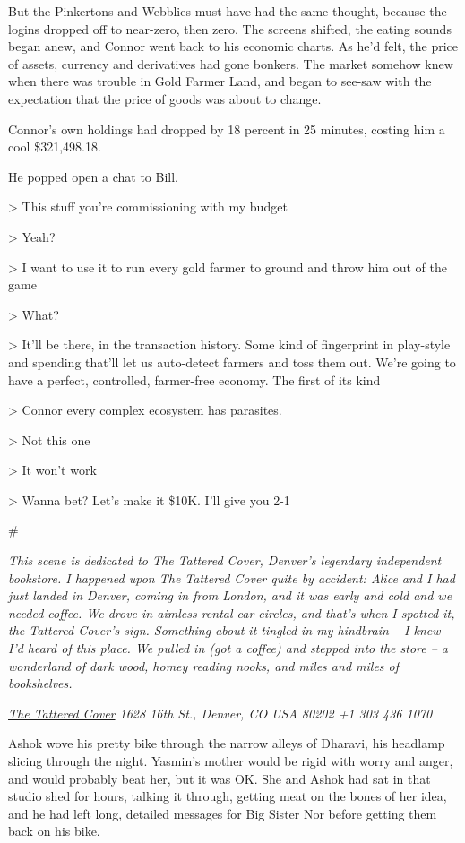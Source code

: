But the Pinkertons and Webblies must have had the same thought,
because the logins dropped off to near-zero, then zero. The screens
shifted, the eating sounds began anew, and Connor went back to his
economic charts. As he'd felt, the price of assets, currency and
derivatives had gone bonkers. The market somehow knew when there
was trouble in Gold Farmer Land, and began to see-saw with the
expectation that the price of goods was about to change.

Connor's own holdings had dropped by 18 percent in 25 minutes,
costing him a cool \$321,498.18.

He popped open a chat to Bill.

\textgreater{} This stuff you're commissioning with my budget

\textgreater{} Yeah?

\textgreater{} I want to use it to run every gold farmer to ground
and throw him out of the game

\textgreater{} What?

\textgreater{} It'll be there, in the transaction history. Some
kind of fingerprint in play-style and spending that'll let us
auto-detect farmers and toss them out. We're going to have a
perfect, controlled, farmer-free economy. The first of its kind

\textgreater{} Connor every complex ecosystem has parasites.

\textgreater{} Not this one

\textgreater{} It won't work

\textgreater{} Wanna bet? Let's make it \$10K. I'll give you 2-1

\#

\emph{This scene is dedicated to The Tattered Cover, Denver's legendary independent bookstore. I happened upon The Tattered Cover quite by accident: Alice and I had just landed in Denver, coming in from London, and it was early and cold and we needed coffee. We drove in aimless rental-car circles, and that's when I spotted it, the Tattered Cover's sign. Something about it tingled in my hindbrain -- I knew I'd heard of this place. We pulled in (got a coffee) and stepped into the store -- a wonderland of dark wood, homey reading nooks, and miles and miles of bookshelves.}

\emph{\href{http://www.tatteredcover.com/book/9780765322166}{The Tattered Cover} 1628 16th St., Denver, CO USA 80202 +1 303 436 1070}

Ashok wove his pretty bike through the narrow alleys of Dharavi,
his headlamp slicing through the night. Yasmin's mother would be
rigid with worry and anger, and would probably beat her, but it was
OK. She and Ashok had sat in that studio shed for hours, talking it
through, getting meat on the bones of her idea, and he had left
long, detailed messages for Big Sister Nor before getting them back
on his bike.

